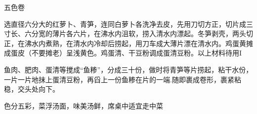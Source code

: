 \begin{recipe}{五色卷}

\ingredients



\cooking

\step 选直径六分大的红萝卜、青笋，连同白萝卜各洗净去皮，先用刀切方正，切片成三寸长、六分宽的薄片各六片，在沸水内沮软，捞入清水内漂起。冬笋剥壳，两头切正，在沸水内煮熟，在清水内冷却后捞起，用刀车成大薄片漂在清水内。鸡蛋黄摊成蛋皮（不要摊老）呈浅黄色。鸡蛋清、干豆粉调成蛋清豆粉。以上材料待用I

\step 鱼肉、肥肉、蛋清等搅成“鱼糁”，分成三十份，做时将青笋等片捞起，粘干水份，一片一片地抹上蛋清豆粉，再舀上一份鱼糁在片的一端.随即裹成卷形，裹紧粘稳，交头处向下。

\notes

色分五彩，菜浮汤面，味美汤鲜，席桌中适宜走中菜

\end{recipe}

